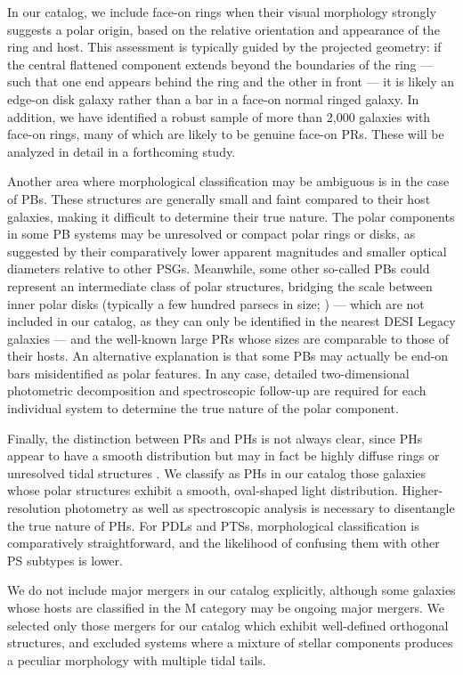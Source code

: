 \documentclass{aa}
\begin{document}
In our catalog, we include face-on rings when their visual morphology strongly suggests a polar origin, based on the relative orientation and appearance of the ring and host. This assessment is typically guided by the projected geometry: if the central flattened component extends beyond the boundaries of the ring --- such that one end appears behind the ring and the other in front --- it is likely an edge-on disk galaxy rather than a bar in a face-on normal ringed galaxy. In addition, we have identified a robust sample of more than 2,000 galaxies with face-on rings, many of which are likely to be genuine face-on PRs. These will be analyzed in detail in a forthcoming study.

Another area where morphological classification may be ambiguous is in the case of PBs. These structures are generally small and faint compared to their host galaxies, making it difficult to determine their true nature. The polar components in some PB systems may be unresolved or compact polar rings or disks, as suggested by their comparatively lower apparent magnitudes and smaller optical diameters relative to other PSGs. Meanwhile, some other so-called PBs could represent an intermediate class of polar structures, bridging the scale between inner polar disks (typically a few hundred parsecs in size; \citealt{2003A&A...408..873C,2012AstBu..67..147M}) --- which are not included in our catalog, as they can only be identified in the nearest DESI Legacy galaxies --- and the well-known large PRs whose sizes are comparable to those of their hosts. An alternative explanation is that some PBs may actually be end-on bars misidentified as polar features. In any case, detailed two-dimensional photometric decomposition and spectroscopic follow-up are required for each individual system to determine the true nature of the polar component.

Finally, the distinction between PRs and PHs is not always clear, since PHs appear to have a smooth distribution but may in fact be highly diffuse rings or unresolved tidal structures \citep{2024A&A...681L..15M}. We classify as PHs in our catalog those galaxies whose polar structures exhibit a smooth, oval-shaped light distribution. Higher-resolution photometry as well as spectroscopic analysis is necessary to disentangle the true nature of PHs. For PDLs and PTSs, morphological classification is comparatively straightforward, and the likelihood of confusing them with other PS subtypes is lower.

We do not include major mergers in our catalog explicitly, although some galaxies whose hosts are classified in the M category may be ongoing major mergers. We selected only those mergers for our catalog which exhibit well-defined orthogonal structures, and excluded systems where a mixture of stellar components produces a peculiar morphology with multiple tidal tails.
\end{document}

